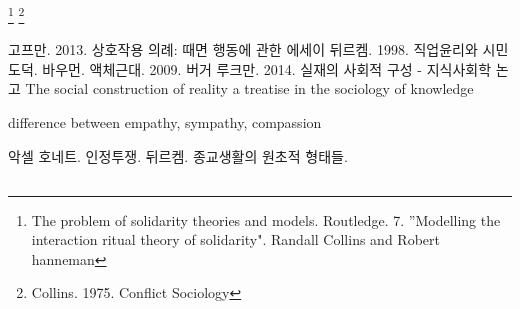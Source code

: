 \documentclass[11pt, a4paper]{article}
\begin{document}
\footnote{The problem of solidarity theories and models. Routledge. 7. ''Modelling the interaction ritual theory of solidarity". Randall Collins and Robert hanneman} \footnote{Collins. 1975. Conflict Sociology}

고프만. 2013. 상호작용 의례: 때면 행동에 관한 에세이
뒤르켐. 1998. 직업윤리와 시민도덕. 
바우먼. 액체근대. 2009.
버거 루크만. 2014. 실재의 사회적 구성 - 지식사회학 논고
The social construction of reality a treatise in the sociology of knowledge

difference between empathy, sympathy, compassion

악셀 호네트. 인정투쟁.
뒤르켐. 종교생활의 원초적 형태들.


\subsection{}


    

\subsection{}

    
    
\subsection{}

    
\subsection{}
\end{document}

